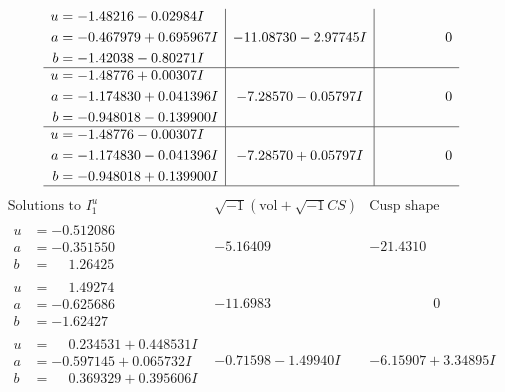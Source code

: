 \documentclass[1p]{elsarticle_modified}
\theoremstyle{definition}
\newcommand{\I}{\sqrt{-1}}
\begin{document}
$$\begin{array}{c|c|c}
\begin{aligned}
u &= -1.48216 - 0.02984 I \\
a &= -0.467979 + 0.695967 I \\
b &= -1.42038 - 0.80271 I\end{aligned}
 & -11.08730 - 2.97745 I & \phantom{-0.000000 } 0 \\ \hline\begin{aligned}
u &= -1.48776 + 0.00307 I \\
a &= -1.174830 + 0.041396 I \\
b &= -0.948018 - 0.139900 I\end{aligned}
 & -7.28570 - 0.05797 I & \phantom{-0.000000 } 0 \\ \hline\begin{aligned}
u &= -1.48776 - 0.00307 I \\
a &= -1.174830 - 0.041396 I \\
b &= -0.948018 + 0.139900 I\end{aligned}
 & -7.28570 + 0.05797 I & \phantom{-0.000000 } 0\\
 \hline 
 \end{array}$$\newpage$$\begin{array}{c|c|c}  
\text{Solutions to }I^u_{1}& \I (\text{vol} + \sqrt{-1}CS) & \text{Cusp shape}\\
 \hline 
\begin{aligned}
u &= -0.512086\phantom{ +0.000000I} \\
a &= -0.351550\phantom{ +0.000000I} \\
b &= \phantom{-}1.26425\phantom{ +0.000000I}\end{aligned}
 & -5.16409\phantom{ +0.000000I} & -21.4310\phantom{ +0.000000I} \\ \hline\begin{aligned}
u &= \phantom{-}1.49274\phantom{ +0.000000I} \\
a &= -0.625686\phantom{ +0.000000I} \\
b &= -1.62427\phantom{ +0.000000I}\end{aligned}
 & -11.6983\phantom{ +0.000000I} & \phantom{-0.000000 } 0 \\ \hline\begin{aligned}
u &= \phantom{-}0.234531 + 0.448531 I \\
a &= -0.597145 + 0.065732 I \\
b &= \phantom{-}0.369329 + 0.395606 I\end{aligned}
 & -0.71598 - 1.49940 I & -6.15907 + 3.34895 I \\ \hline\begin{aligned}

\end{aligned}
\end{array}$$
\end{document}
